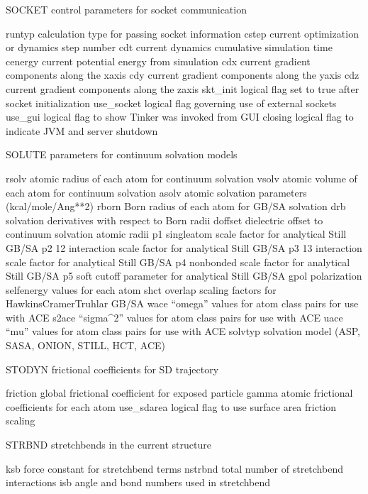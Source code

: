 \documentclass[letterpaper,11pt,english]{sphinxmanual}
\begin{document}
SOCKET  control parameters for socket communication

runtyp  calculation type for passing socket information
cstep   current optimization or dynamics step number
cdt     current dynamics cumulative simulation time
cenergy current potential energy from simulation
cdx     current gradient components along the x\sphinxhyphen{}axis
cdy     current gradient components along the y\sphinxhyphen{}axis
cdz     current gradient components along the z\sphinxhyphen{}axis
skt\_init        logical flag set to true after socket initialization
use\_socket      logical flag governing use of external sockets
use\_gui logical flag to show Tinker was invoked from GUI
closing logical flag to indicate JVM and server shutdown

SOLUTE  parameters for continuum solvation models

rsolv   atomic radius of each atom for continuum solvation
vsolv   atomic volume of each atom for continuum solvation
asolv   atomic solvation parameters (kcal/mole/Ang**2)
rborn   Born radius of each atom for GB/SA solvation
drb     solvation derivatives with respect to Born radii
doffset dielectric offset to continuum solvation atomic radii
p1      single\sphinxhyphen{}atom scale factor for analytical Still GB/SA
p2      1\sphinxhyphen{}2 interaction scale factor for analytical Still GB/SA
p3      1\sphinxhyphen{}3 interaction scale factor for analytical Still GB/SA
p4      nonbonded scale factor for analytical Still GB/SA
p5      soft cutoff parameter for analytical Still GB/SA
gpol    polarization self\sphinxhyphen{}energy values for each atom
shct    overlap scaling factors for Hawkins\sphinxhyphen{}Cramer\sphinxhyphen{}Truhlar GB/SA
wace    “omega” values for atom class pairs for use with ACE
s2ace   “sigma\textasciicircum{}2” values for atom class pairs for use with ACE
uace    “mu” values for atom class pairs for use with ACE
solvtyp solvation model (ASP, SASA, ONION, STILL, HCT, ACE)

STODYN  frictional coefficients for SD trajectory

friction        global frictional coefficient for exposed particle
gamma   atomic frictional coefficients for each atom
use\_sdarea      logical flag to use surface area friction scaling

STRBND  stretch\sphinxhyphen{}bends in the current structure

ksb     force constant for stretch\sphinxhyphen{}bend terms
nstrbnd total number of stretch\sphinxhyphen{}bend interactions
isb     angle and bond numbers used in stretch\sphinxhyphen{}bend
\end{document}
